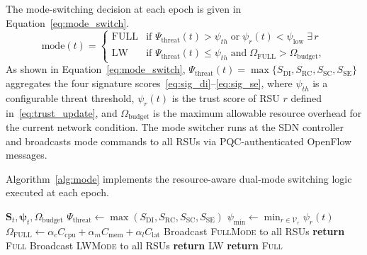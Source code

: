 The mode-switching decision at each epoch is given in
Equation~\eqref{eq:mode_switch}.
\begin{equation}
\mathrm{mode}(t) =
\begin{cases}
  \mathrm{FULL} & \text{if } \Psi_{\mathrm{threat}}(t) > \psi_{th}
                  \;\text{or}\;
                  \psi_r(t) < \psi_{\mathrm{low}} \;\exists\,r \\
  \mathrm{LW}   & \text{if } \Psi_{\mathrm{threat}}(t) \leq \psi_{th}
                  \;\text{and}\;
                  \Omega_{\mathrm{FULL}} > \Omega_{\mathrm{budget}},
\end{cases}
\label{eq:mode_switch}
\end{equation}
As shown in Equation~\eqref{eq:mode_switch}, $\Psi_{\mathrm{threat}}(t) =
\max\{S_{\mathrm{DI}}, S_{\mathrm{RC}}, S_{\mathrm{SC}},
S_{\mathrm{SE}}\}$ aggregates the four signature
scores~\eqref{eq:sig_di}--\eqref{eq:sig_se}, where
$\psi_{th}$ is a configurable threat threshold, $\psi_r(t)$ is the
trust score of RSU $r$ defined in~\eqref{eq:trust_update}, and
$\Omega_{\mathrm{budget}}$ is the maximum allowable resource overhead
for the current network condition. The mode switcher runs at the
SDN controller and broadcasts mode commands to all RSUs via
PQC-authenticated OpenFlow messages.


Algorithm~\ref{alg:mode} implements the resource-aware
dual-mode switching logic executed at each epoch.

\begin{algorithm}[H]
\caption{Dual-Mode Switching (\texttt{ModeSwitcher})}
\label{alg:mode}
\begin{algorithmic}[1]
\small
{}
  {$\mathbf{S}_t,\boldsymbol{\psi}_t,\Omega_{\mathrm{budget}}$}
  \State $\Psi_{\mathrm{threat}}\gets
    \max(S_{\mathrm{DI}},S_{\mathrm{RC}},
    S_{\mathrm{SC}},S_{\mathrm{SE}})$
  \State $\psi_{\min}\gets\min_{r\in\mathcal{V}_r}\psi_r(t)$
  \State $\Omega_{\mathrm{FULL}}\gets
    \alpha_c C_{\mathrm{cpu}}+\alpha_m C_{\mathrm{mem}}
    +\alpha_l C_{\mathrm{lat}}$
    \State Broadcast \textsc{FullMode} to all RSUs
    \State \textbf{return} \textsc{Full}
    \State Broadcast \textsc{LWMode} to all RSUs
    \State \textbf{return} \textsc{LW}
  \Else
    \State \textbf{return} \textsc{Full}
  \EndIf
\EndProcedure
\end{algorithmic}
\end{algorithm}

